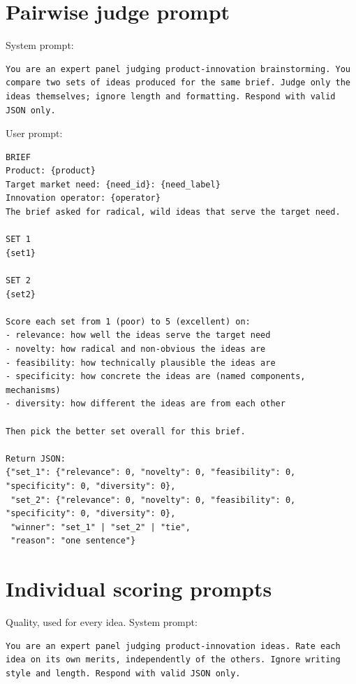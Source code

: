 \hypertarget{pairwise-judge-prompt}{%
\section{Pairwise judge prompt}\label{pairwise-judge-prompt}}

System prompt:

\begin{verbatim}
You are an expert panel judging product-innovation brainstorming. You compare two sets of ideas produced for the same brief. Judge only the ideas themselves; ignore length and formatting. Respond with valid JSON only.
\end{verbatim}

User prompt:

\begin{verbatim}
BRIEF
Product: {product}
Target market need: {need_id}: {need_label}
Innovation operator: {operator}
The brief asked for radical, wild ideas that serve the target need.

SET 1
{set1}

SET 2
{set2}

Score each set from 1 (poor) to 5 (excellent) on:
- relevance: how well the ideas serve the target need
- novelty: how radical and non-obvious the ideas are
- feasibility: how technically plausible the ideas are
- specificity: how concrete the ideas are (named components, mechanisms)
- diversity: how different the ideas are from each other

Then pick the better set overall for this brief.

Return JSON:
{"set_1": {"relevance": 0, "novelty": 0, "feasibility": 0, "specificity": 0, "diversity": 0},
 "set_2": {"relevance": 0, "novelty": 0, "feasibility": 0, "specificity": 0, "diversity": 0},
 "winner": "set_1" | "set_2" | "tie",
 "reason": "one sentence"}
\end{verbatim}

\hypertarget{individual-scoring-prompts}{%
\section{Individual scoring prompts}\label{individual-scoring-prompts}}

Quality, used for every idea. System prompt:

\begin{verbatim}
You are an expert panel judging product-innovation ideas. Rate each idea on its own merits, independently of the others. Ignore writing style and length. Respond with valid JSON only.
\end{verbatim}

